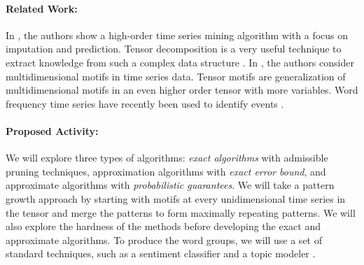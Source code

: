 \paragraph{Related Work:}

In \cite{Yongjie2015}, the authors show a high-order time series mining algorithm with a focus on imputation and prediction. Tensor decomposition is a very useful technique to extract knowledge from such a complex data structure \cite{kolda2009tensor}. In \cite{Minnen:07,Minnen:07a}, the authors consider multidimensional motifs in time series data. Tensor motifs are generalization of multidimensional motifs in an even higher order tensor with more variables. Word frequency time series have recently been used to identify events \cite{Liang2015}. 









\paragraph{Proposed Activity:}

We will explore three types of algorithms: {\it exact algorithms} with admissible pruning techniques, approximation algorithms with {\it exact error bound}, and approximate algorithms with {\it probabilistic guarantees}. We will take a pattern growth approach by starting with motifs at every unidimensional time series in the tensor and merge the patterns to form maximally repeating patterns. We will also explore the hardness of the methods before developing the exact and approximate algorithms. To produce the word groups, we will use a set of standard techniques, such as a sentiment classifier \cite{manning14} and a topic modeler \cite{TopicModel}.








